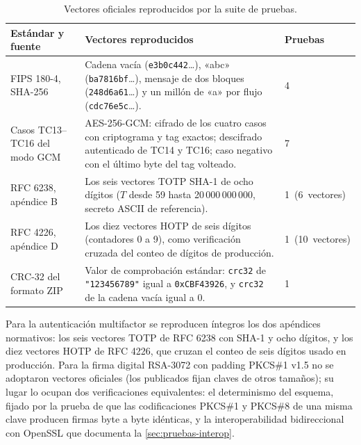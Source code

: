 \begin{table}[H]
  \centering
  \caption{Vectores oficiales reproducidos por la suite de pruebas.}
  \label{tab:pruebas-vectores}
  \begin{tabularx}{\linewidth}{@{}L{3.8cm} >{\raggedright\arraybackslash}X C{2.5cm}@{}}
    \toprule
    \textbf{Estándar y fuente} & \textbf{Vectores reproducidos} & \textbf{Pruebas} \\
    \midrule
    FIPS 180-4, SHA-256 \cite{nist2015fips1804} & Cadena vacía (\texttt{e3b0c442}\ldots), «abc» (\texttt{ba7816bf}\ldots), mensaje de dos bloques (\texttt{248d6a61}\ldots) y un millón de «a» por flujo (\texttt{cdc76e5c}\ldots). & 4 \\
    \addlinespace
    Casos TC13--TC16 del modo GCM \cite{mcgrewviega2004,dworkin2007} & AES-256-GCM: cifrado de los cuatro casos con criptograma y tag exactos; descifrado autenticado de TC14 y TC16; caso negativo con el último byte del tag volteado. & 7 \\
    \addlinespace
    RFC 6238, apéndice B \cite{mraihi2011} & Los seis vectores TOTP SHA-1 de ocho dígitos ($T$ desde 59 hasta 20\,000\,000\,000, secreto ASCII de referencia). & 1~(6~vectores) \\
    \addlinespace
    RFC 4226, apéndice D \cite{mraihi2005} & Los diez vectores HOTP de seis dígitos (contadores 0 a 9), como verificación cruzada del conteo de dígitos de producción. & 1~(10~vectores) \\
    \addlinespace
    CRC-32 del formato ZIP & Valor de comprobación estándar: \texttt{crc32} de \texttt{"123456789"} igual a \texttt{0xCBF43926}, y \texttt{crc32} de la cadena vacía igual a 0. & 1 \\
    \bottomrule
  \end{tabularx}
\end{table}

Para la autenticación multifactor se reproducen íntegros los dos apéndices normativos: los seis vectores TOTP de RFC 6238 con SHA-1 y ocho dígitos, y los diez vectores HOTP de RFC 4226, que cruzan el conteo de seis dígitos usado en producción. Para la firma digital RSA-3072 con padding PKCS\#1 v1.5 no se adoptaron vectores oficiales (los publicados fijan claves de otros tamaños); su lugar lo ocupan dos verificaciones equivalentes: el determinismo del esquema, fijado por la prueba de que las codificaciones PKCS\#1 y PKCS\#8 de una misma clave producen firmas byte a byte idénticas, y la interoperabilidad bidireccional con OpenSSL que documenta la \cref{sec:pruebas-interop}.

